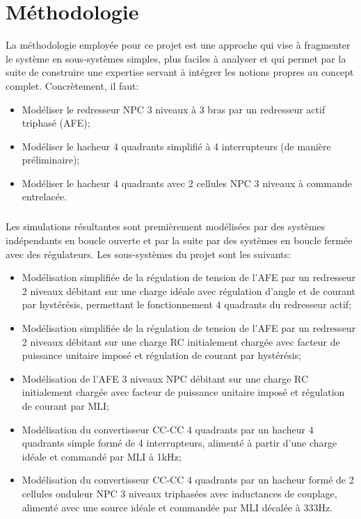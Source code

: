 \chapter{Méthodologie}
La méthodologie employée pour ce projet est une approche qui vise à fragmenter le système en sous-systèmes simples, plus faciles à analyser et qui permet par la suite de construire une expertise servant à intégrer les notions propres au concept complet. Concrètement, il faut:
\begin{itemize}
\item Modéliser le redresseur NPC 3 niveaux à 3 bras par un redresseur actif triphasé (AFE);
\item Modéliser le hacheur 4 quadrants simplifié à 4 interrupteurs (de manière préliminaire);
\item Modéliser le hacheur 4 quadrants avec 2 cellules NPC 3 niveaux à commande entrelacée.
\end{itemize}
\paragraph{} Les simulations résultantes sont premièrement modélisées par des systèmes indépendants en boucle ouverte et par la suite par des systèmes en boucle fermée avec des régulateurs. Les sous-systèmes du projet sont les suivants:
\begin{itemize}
\item Modélisation simplifiée de la régulation de tension de l'AFE par un redresseur 2 niveaux débitant sur une charge idéale avec régulation d'angle et de courant par hystérésis, permettant le fonctionnement 4 quadrants du redresseur actif;
\item Modélisation simplifiée de la régulation de tension  de l'AFE par un redresseur 2 niveaux débitant sur une charge RC initialement chargée avec facteur de puissance unitaire imposé et régulation de courant par hystérésis;
\item Modélisation de l'AFE 3 niveaux NPC  débitant sur une charge RC initialement chargée avec facteur de puissance unitaire imposé et régulation de courant par MLI;
\item Modélisation du convertisseur CC-CC 4 quadrants par un hacheur 4 quadrants simple formé de 4 interrupteurs, alimenté à partir d'une charge idéale et commandé par MLI à 1kHz;
\item Modélisation du convertisseur CC-CC 4 quadrants par un hacheur formé de 2 cellules onduleur NPC 3 niveaux triphasées avec inductances de couplage, alimenté avec une source idéale et commandée par MLI décalée à 333Hz.
\end{itemize}

